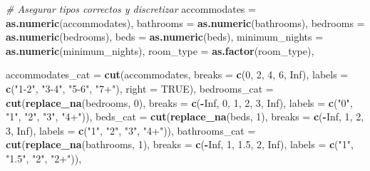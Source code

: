 \documentclass[
]{article}
\newenvironment{Shaded}{\begin{snugshade}}{\end{snugshade}}
\newcommand{\AttributeTok}[1]{\textcolor[rgb]{0.13,0.29,0.53}{#1}}
\newcommand{\CommentTok}[1]{\textcolor[rgb]{0.56,0.35,0.01}{\textit{#1}}}
\newcommand{\ConstantTok}[1]{\textcolor[rgb]{0.56,0.35,0.01}{#1}}
\newcommand{\DecValTok}[1]{\textcolor[rgb]{0.00,0.00,0.81}{#1}}
\newcommand{\FloatTok}[1]{\textcolor[rgb]{0.00,0.00,0.81}{#1}}
\newcommand{\FunctionTok}[1]{\textcolor[rgb]{0.13,0.29,0.53}{\textbf{#1}}}
\newcommand{\NormalTok}[1]{#1}
\newcommand{\SpecialCharTok}[1]{\textcolor[rgb]{0.81,0.36,0.00}{\textbf{#1}}}
\newcommand{\StringTok}[1]{\textcolor[rgb]{0.31,0.60,0.02}{#1}}
\begin{document}
\begin{Shaded}
\begin{Highlighting}[]
    \CommentTok{\# Asegurar tipos correctos y discretizar}
    \AttributeTok{accommodates =} \FunctionTok{as.numeric}\NormalTok{(accommodates),}
    \AttributeTok{bathrooms    =} \FunctionTok{as.numeric}\NormalTok{(bathrooms),}
    \AttributeTok{bedrooms     =} \FunctionTok{as.numeric}\NormalTok{(bedrooms),}
    \AttributeTok{beds         =} \FunctionTok{as.numeric}\NormalTok{(beds),}
    \AttributeTok{minimum\_nights =} \FunctionTok{as.numeric}\NormalTok{(minimum\_nights),}
    \AttributeTok{room\_type    =} \FunctionTok{as.factor}\NormalTok{(room\_type),}
    
    \AttributeTok{accommodates\_cat =} \FunctionTok{cut}\NormalTok{(accommodates, }\AttributeTok{breaks =} \FunctionTok{c}\NormalTok{(}\DecValTok{0}\NormalTok{, }\DecValTok{2}\NormalTok{, }\DecValTok{4}\NormalTok{, }\DecValTok{6}\NormalTok{, }\ConstantTok{Inf}\NormalTok{), }\AttributeTok{labels =} \FunctionTok{c}\NormalTok{(}\StringTok{"1{-}2"}\NormalTok{, }\StringTok{"3{-}4"}\NormalTok{, }\StringTok{"5{-}6"}\NormalTok{, }\StringTok{"7+"}\NormalTok{), }\AttributeTok{right =} \ConstantTok{TRUE}\NormalTok{),}
    \AttributeTok{bedrooms\_cat     =} \FunctionTok{cut}\NormalTok{(}\FunctionTok{replace\_na}\NormalTok{(bedrooms, }\DecValTok{0}\NormalTok{), }\AttributeTok{breaks =} \FunctionTok{c}\NormalTok{(}\SpecialCharTok{{-}}\ConstantTok{Inf}\NormalTok{, }\DecValTok{0}\NormalTok{, }\DecValTok{1}\NormalTok{, }\DecValTok{2}\NormalTok{, }\DecValTok{3}\NormalTok{, }\ConstantTok{Inf}\NormalTok{), }\AttributeTok{labels =} \FunctionTok{c}\NormalTok{(}\StringTok{"0"}\NormalTok{, }\StringTok{"1"}\NormalTok{, }\StringTok{"2"}\NormalTok{, }\StringTok{"3"}\NormalTok{, }\StringTok{"4+"}\NormalTok{)),}
    \AttributeTok{beds\_cat         =} \FunctionTok{cut}\NormalTok{(}\FunctionTok{replace\_na}\NormalTok{(beds, }\DecValTok{1}\NormalTok{), }\AttributeTok{breaks =} \FunctionTok{c}\NormalTok{(}\SpecialCharTok{{-}}\ConstantTok{Inf}\NormalTok{, }\DecValTok{1}\NormalTok{, }\DecValTok{2}\NormalTok{, }\DecValTok{3}\NormalTok{, }\ConstantTok{Inf}\NormalTok{), }\AttributeTok{labels =} \FunctionTok{c}\NormalTok{(}\StringTok{"1"}\NormalTok{, }\StringTok{"2"}\NormalTok{, }\StringTok{"3"}\NormalTok{, }\StringTok{"4+"}\NormalTok{)),}
    \AttributeTok{bathrooms\_cat    =} \FunctionTok{cut}\NormalTok{(}\FunctionTok{replace\_na}\NormalTok{(bathrooms, }\DecValTok{1}\NormalTok{), }\AttributeTok{breaks =} \FunctionTok{c}\NormalTok{(}\SpecialCharTok{{-}}\ConstantTok{Inf}\NormalTok{, }\DecValTok{1}\NormalTok{, }\FloatTok{1.5}\NormalTok{, }\DecValTok{2}\NormalTok{, }\ConstantTok{Inf}\NormalTok{), }\AttributeTok{labels =} \FunctionTok{c}\NormalTok{(}\StringTok{"1"}\NormalTok{, }\StringTok{"1.5"}\NormalTok{, }\StringTok{"2"}\NormalTok{, }\StringTok{"2+"}\NormalTok{)),}

\end{Highlighting}
\end{Shaded}
\end{document}
